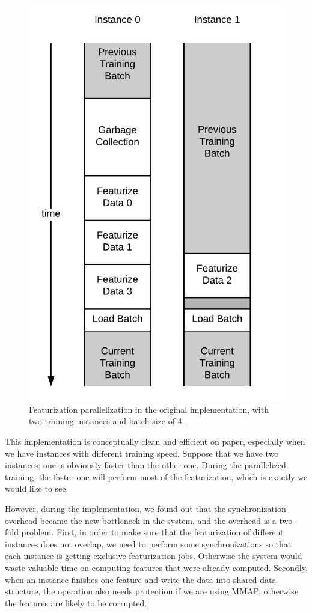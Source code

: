 \documentclass[conference]{IEEEtran}
\begin{document}
\begin{figure}[!htb]
	\includegraphics[width=\linewidth]{oi.png}
	\caption{\small 
		Featurization parallelization in the original implementation, with two training instances and batch size of 4. }
	\label{fig:oi}
\end{figure}

This implementation is conceptually clean and efficient on paper, especially when we have instances with different training speed. 
Suppose that we have two instances: one is obviously faster than the other one. 
During the parallelized training, the faster one will perform most of the featurization, which is exactly we would like to see. 

However, during the implementation, we found out that the synchronization overhead became the new bottleneck in the system, and the overhead is a two-fold problem. 
First, in order to make sure that the featurization of different instances does not overlap, we need to perform some synchronizations so that each instance is getting exclusive featurization jobs. 
Otherwise the system would waste valuable time on computing features that were already computed. 
Secondly, when an instance finishes one feature and write the data into shared data structure, the operation also needs protection if we are using MMAP, otherwise the features are likely to be corrupted. 
\end{document}
